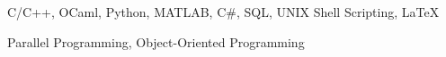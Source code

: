

\begin{cventries}

\cvskills
  {
    \begin{cvitems} %
      \item {C/C++, OCaml, Python, MATLAB, C\#, SQL, UNIX Shell Scripting, LaTeX} %
      \item {Parallel Programming, Object-Oriented Programming}
    \end{cvitems}
  }
\end{cventries}
